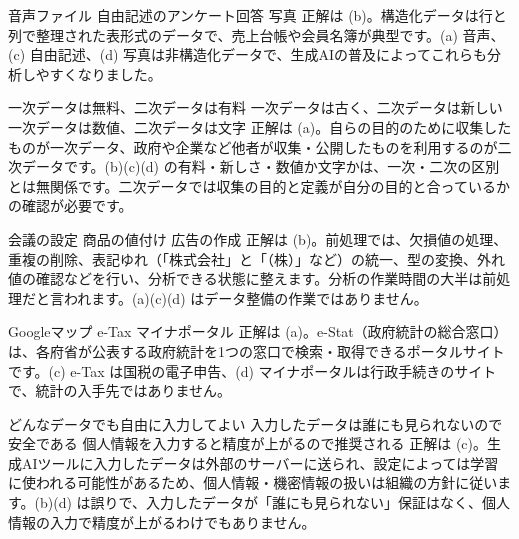 
%
  {音声ファイル}%
  {}%
  {自由記述のアンケート回答}%
  {写真}%
  {正解は (b)。構造化データは行と列で整理された表形式のデータで、売上台帳や会員名簿が典型です。(a) 音声、(c) 自由記述、(d) 写真は非構造化データで、生成AIの普及によってこれらも分析しやすくなりました。}

%
  {}%
  {一次データは無料、二次データは有料}%
  {一次データは古く、二次データは新しい}%
  {一次データは数値、二次データは文字}%
  {正解は (a)。自らの目的のために収集したものが一次データ、政府や企業など他者が収集・公開したものを利用するのが二次データです。(b)(c)(d) の有料・新しさ・数値か文字かは、一次・二次の区別とは無関係です。二次データでは収集の目的と定義が自分の目的と合っているかの確認が必要です。}

%
  {会議の設定}%
  {}%
  {商品の値付け}%
  {広告の作成}%
  {正解は (b)。前処理では、欠損値の処理、重複の削除、表記ゆれ（「株式会社」と「（株）」など）の統一、型の変換、外れ値の確認などを行い、分析できる状態に整えます。分析の作業時間の大半は前処理だと言われます。(a)(c)(d) はデータ整備の作業ではありません。}

%
  {}%
  {Googleマップ}%
  {e-Tax}%
  {マイナポータル}%
  {正解は (a)。e-Stat（政府統計の総合窓口）は、各府省が公表する政府統計を1つの窓口で検索・取得できるポータルサイトです。(c) e-Tax は国税の電子申告、(d) マイナポータルは行政手続きのサイトで、統計の入手先ではありません。}

%
  {どんなデータでも自由に入力してよい}%
  {入力したデータは誰にも見られないので安全である}%
  {}%
  {個人情報を入力すると精度が上がるので推奨される}%
  {正解は (c)。生成AIツールに入力したデータは外部のサーバーに送られ、設定によっては学習に使われる可能性があるため、個人情報・機密情報の扱いは組織の方針に従います。(b)(d) は誤りで、入力したデータが「誰にも見られない」保証はなく、個人情報の入力で精度が上がるわけでもありません。}
